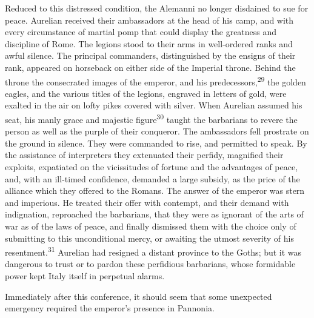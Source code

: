 Reduced to this distressed condition, the Alemanni no longer
disdained to sue for peace. Aurelian received their ambassadors
at the head of his camp, and with every circumstance of martial
pomp that could display the greatness and discipline of Rome. The
legions stood to their arms in well-ordered ranks and awful
silence. The principal commanders, distinguished by the ensigns
of their rank, appeared on horseback on either side of the
Imperial throne. Behind the throne the consecrated images of the
emperor, and his predecessors,\textsuperscript{29} the golden eagles, and the
various titles of the legions, engraved in letters of gold, were
exalted in the air on lofty pikes covered with silver. When
Aurelian assumed his seat, his manly grace and majestic figure\textsuperscript{30}
taught the barbarians to revere the person as well as the purple
of their conqueror. The ambassadors fell prostrate on the ground
in silence. They were commanded to rise, and permitted to speak.
By the assistance of interpreters they extenuated their perfidy,
magnified their exploits, expatiated on the vicissitudes of
fortune and the advantages of peace, and, with an ill-timed
confidence, demanded a large subsidy, as the price of the
alliance which they offered to the Romans. The answer of the
emperor was stern and imperious. He treated their offer with
contempt, and their demand with indignation, reproached the
barbarians, that they were as ignorant of the arts of war as of
the laws of peace, and finally dismissed them with the choice
only of submitting to this unconditional mercy, or awaiting the
utmost severity of his resentment.\textsuperscript{31} Aurelian had resigned a
distant province to the Goths; but it was dangerous to trust or
to pardon these perfidious barbarians, whose formidable power
kept Italy itself in perpetual alarms.




Immediately after this conference, it should seem that some
unexpected emergency required the emperor’s presence in Pannonia.

